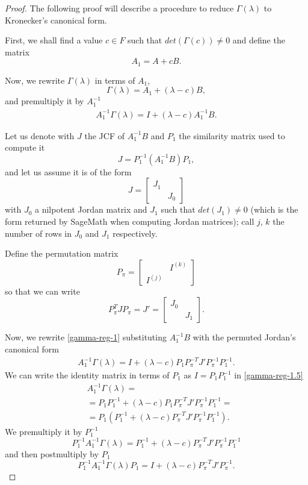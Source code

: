 \begin{proof}
    The following proof will describe a procedure to reduce \(\Gamma(\lambda)\) to Kronecker's canonical form.

    First, we shall find a value \(c \in F\) such that \(det(\Gamma(c)) \neq 0\) and define the matrix 
    \[
        A_{1} = A + cB.
    \]

    Now, we rewrite \(\Gamma(\lambda)\) in terms of \(A_{1}\),
    \[
        \Gamma(\lambda) = A_{1} + (\lambda - c)B,
    \]
    and premultiply it by \(A_{1}^{-1}\)
    \begin{gather}
        A_{1}^{-1} \Gamma(\lambda) = I + (\lambda - c)A_{1}^{-1}B. \label{gamma-reg-1}
    \end{gather}

    Let us denote with \(J\) the JCF of \(A_{1}^{-1}B\) and \(P_{1}\) the similarity matrix used to compute it
    \[
        J = P_{1}^{-1}(A_{1}^{-1}B)P_{1},
    \]
    and let us assume it is of the form
    \[
        J =
        \begin{bmatrix}
            J_{1} & \\
            & J_{0}
        \end{bmatrix}
    \]
    with \(J_{0}\) a nilpotent Jordan matrix and \(J_{1}\) such that \(det(J_{1}) \neq 0\) (which is the form returned by
    SageMath when computing Jordan matrices); call \(j\), \(k\) the number of rows in \(J_{0}\) and \(J_{1}\) respectively.

    Define the permutation matrix
    \[
        P_{\pi} =
        \begin{bmatrix}
            & I^{(k)}\\
            I^{(j)} &
        \end{bmatrix}
    \]
    so that we can write
    \[
        P_{\pi}^T J P_{\pi} = J' =
        \begin{bmatrix}
            J_{0} & \\
            & J_{1}
        \end{bmatrix}.
    \]

    Now, we rewrite \eqref{gamma-reg-1} substituting \(A_{1}^{-1}B\) with the permuted Jordan's canonical form
    \begin{gather}
        A_{1}^{-1} \Gamma(\lambda) = I + (\lambda - c)P_{1} P_{\pi}^{-T} J' P_{\pi}^{-1} P_{1}^{-1}.
        \label{gamma-reg-1.5}
    \end{gather}
    We can write the identity matrix in terms of \(P_{1}\) as \(I = P_{1}P_{1}^{-1}\) in \eqref{gamma-reg-1.5}
    \begin{align*}
        & A_{1}^{-1} \Gamma(\lambda) = \\
        &= P_{1}P_{1}^{-1} + (\lambda - c)P_{1} P_{\pi}^{-T} J' P_{\pi}^{-1} P_{1}^{-1} = \\
        &= P_{1}(P_{1}^{-1} + (\lambda - c)P_{\pi}^{-T} J' P_{\pi}^{-1} P_{1}^{-1}).
    \end{align*}
    We premultiply it by \(P_{1}^{-1}\)
    \[
        P_{1}^{-1} A_{1}^{-1} \Gamma(\lambda) = P_{1}^{-1} + (\lambda - c)P_{\pi}^{-T} J' P_{\pi}^{-1} P_{1}^{-1}
    \]
    and then postmultiply by \(P_{1}\)
    \[
        P_{1}^{-1} A_{1}^{-1} \Gamma(\lambda) P_{1} = I + (\lambda - c)P_{\pi}^{-T} J' P_{\pi}^{-1}.
    \]


\end{proof}
